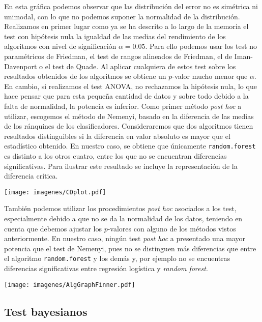 	En esta gráfica podemos observar que las distribución del
error no es simétrica ni unimodal, con lo que no podemos
suponer la normalidad de la distribución. Realizamos en 
primer lugar como ya se ha descrito a lo largo de la memoria
el test con hipótesis nula la igualdad de las medias del
rendimiento de los algoritmos con nivel de significación
$\alpha = 0.05$. Para ello podemos usar
los test no paramétricos de Friedman, el test de
rangos alineados de Friedman, el de Iman-Davenport o el
test de Quade. Al aplicar cualquiera de estos test sobre
los resultados obtenidos de los algoritmos se obtiene
un $p$-valor mucho menor que $\alpha$. En cambio, 
si realizamos el test ANOVA, no rechazamos la hipótesis
nula, lo que hace pensar que para esta pequeña cantidad de
datos y sobre todo debido a la falta de normalidad, la
potencia es inferior. Como primer método \textit{post hoc}
a utilizar, escogemos el método de Nemenyi, basado en la
diferencia de las medias de los ránquines de los 
clasificadores. Consideraremos que dos algoritmos tienen
resultados distinguibles si la diferencia en valor absoluto
es mayor que el estadístico obtenido. En nuestro caso, 
se obtiene que únicamente \texttt{random.forest} es distinto
a los otros cuatro, entre los que no se encuentran 
diferencias significativas. Para ilustrar este resultado
se incluye la representación de la diferencia crítica.

\texttt{[image: imagenes/CDplot.pdf]}


	También podemos utilizar los procedimientos \textit{post
hoc} asociados a los test, especialmente debido a que no
se da la normalidad de los datos, teniendo en cuenta que
debemos ajustar los $p$-valores con alguno de los métodos
vistos anteriormente. En nuestro caso, ningún test 
\textit{post hoc} a presentado una mayor potencia que el
test de Nemenyi, pues no se distinguen más diferencias que 
entre el algoritmo \texttt{random.forest} y los demás y, por
ejemplo no se encuentras diferencias significativas entre  
regresión logística y \textit{random forest}.

\texttt{[image: imagenes/AlgGraphFinner.pdf]}

\subsection*{Test bayesianos}


